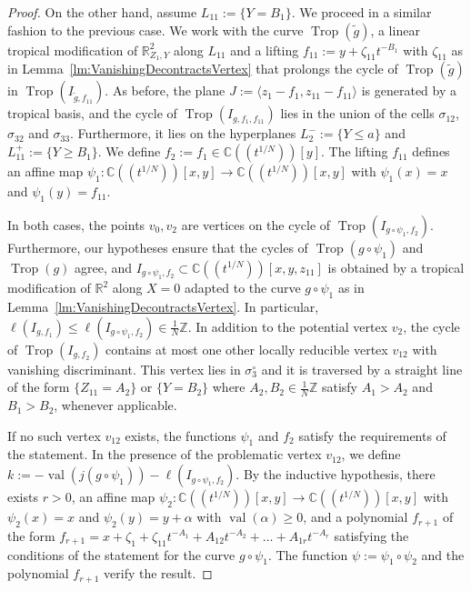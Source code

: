 \documentclass[11pt]{amsart}
\numberwithin{equation}{section}
\theoremstyle{plain}
\theoremstyle{definition}
\theoremstyle{remark}
\begin{document}
\begin{proof}
  On the other hand, assume $L_{11}:=\{Y=B_1\}$. We proceed in a
  similar fashion to the previous case. We work with the curve
  $\operatorname{Trop}(\tilde{g})$, a linear tropical modification of
  ${\mathbb{R}}^2_{Z_1,Y}$ along $L_{11}$ and a lifting
  $f_{11}:=y+{\zeta}_{11}t^{-B_1}$ with ${\zeta}_{11}$ as in
  Lemma~\ref{lm:VanishingDecontractsVertex} that prolongs the cycle of
  $\operatorname{Trop}(\tilde{g})$ in $\operatorname{Trop}(I_{\tilde{g},f_{11}})$.  As before, the
  plane $J:=\langle z_1-f_1,z_{11}-f_{11}\rangle$ is generated by a
  tropical basis, and the cycle of $\operatorname{Trop}(I_{g,f_1,f_{11}})$ lies in
  the union of the cells $\sigma_{12}$, $\sigma_{32}$ and
  $\sigma_{33}$. Furthermore, it lies on the hyperplanes
  $L_2^-:=\{Y\leq a\}$ and $L_{11}^+:=\{Y\geq B_1\}$.  We define
  $f_2:=f_1\in {{\mathbb{C}}(\!(t^{1/N})\!)}[y]$.  The lifting $f_{11}$ defines an affine map
  $\psi_1\colon {{\mathbb{C}}(\!(t^{1/N})\!)}[x,y]\to {{\mathbb{C}}(\!(t^{1/N})\!)}[x,y]$ with $\psi_1(x)=x$ and
  $\psi_1(y)=f_{11}$.

  In both cases, the points $v_0,v_2$ are vertices on the cycle of
  $\operatorname{Trop}(I_{g\circ \psi_1,f_2})$. Furthermore, our hypotheses ensure
  that the cycles of $\operatorname{Trop}(g\circ \psi_1)$ and $\operatorname{Trop}(g)$ agree, and
  $I_{g\circ \psi_1, f_2}\subset {{\mathbb{C}}(\!(t^{1/N})\!)}[x,y,z_{11}]$ is obtained by a
  tropical modification of ${\mathbb{R}}^2$ along $X=0$ adapted to the curve
  $g\circ \psi_1$ as in Lemma~\ref{lm:VanishingDecontractsVertex}. In
  particular, $\ell(I_{g,f_1})\leq \ell(I_{g\circ \psi_1,f_2}) \in
  \frac{1}{N}{\mathbb{Z}}$.  In addition to the potential vertex $v_2$, the
  cycle of $\operatorname{Trop}(I_{g,f_2})$ contains at most one other locally
  reducible vertex $v_{12}$ with vanishing discriminant. This vertex
  lies in $\sigma_3^{\circ}$ and it is traversed by a straight line of
  the form $\{Z_{11}=A_2\}$ or $\{Y=B_2\}$ where $A_2,B_2\in
  \frac{1}{N}{\mathbb{Z}}$ satisfy $A_1>A_2$ and $B_1>B_2$, whenever
  applicable.

  If no such vertex $v_{12}$ exists, the functions $\psi_1$ and $f_2$
  satisfy the requirements of the statement. In the presence of the
  problematic vertex $v_{12}$, we define
  $k:=-\operatorname{val}(j(g\circ\psi_1))-\ell(I_{g\circ \psi_1,f_2})$. By the
  inductive hypothesis, there exists $r>0$, an affine map
  $\psi_2\colon {{\mathbb{C}}(\!(t^{1/N})\!)}[x,y]\to {{\mathbb{C}}(\!(t^{1/N})\!)}[x,y]$ with $\psi_2(x)=x$ and
  $\psi_2(y)=y+\alpha$ with $\operatorname{val}(\alpha)\geq 0$, and a polynomial
  $f_{r+1}$ of the form
  $f_{r+1}=x+{\zeta}_1+{\zeta}_{11}t^{-A_1}+A_{12}t^{-A_2}+\ldots +
  A_{1r}t^{-A_r}$ satisfying the conditions of the statement for the
  curve $g\circ \psi_1$. The function $\psi:=\psi_1\circ \psi_2$ and
  the polynomial $f_{r+1}$ verify the result.


\end{proof}
\end{document}
